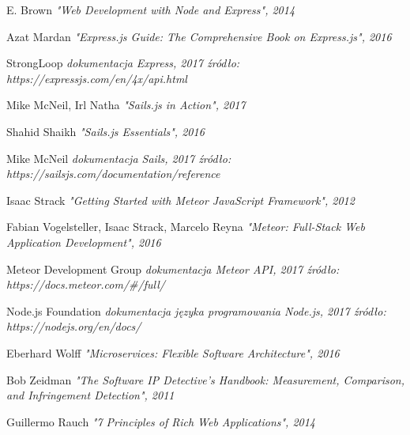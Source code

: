 \documentclass[12pt]{report}
\begin{document}

\begin{thebibliography}{99}
    E. Brown \newline
    \textit{"Web Development with Node and Express", 2014}

    Azat Mardan \newline
    \textit{"Express.js Guide: The Comprehensive Book on Express.js", 2016}

    StrongLoop \newline
    \textit{dokumentacja Express, 2017 \newline źródło: https://expressjs.com/en/4x/api.html}

    Mike McNeil, Irl Natha \newline
    \textit{"Sails.js in Action", 2017}

    Shahid Shaikh \newline
    \textit{"Sails.js Essentials", 2016}

    Mike McNeil \newline
    \textit{dokumentacja Sails, 2017 \newline źródło: https://sailsjs.com/documentation/reference}

    Isaac Strack \newline
    \textit{"Getting Started with Meteor JavaScript Framework", 2012}

    Fabian Vogelsteller, Isaac Strack, Marcelo Reyna \newline
    \textit{"Meteor: Full-Stack Web Application Development", 2016}

    Meteor Development Group \newline
    \textit{dokumentacja Meteor API, 2017 \newline źródło: https://docs.meteor.com/\#/full/}

    Node.js Foundation \newline
    \textit{dokumentacja języka programowania Node.js, 2017 \newline źródło: https://nodejs.org/en/docs/}

    Eberhard Wolff \newline
    \textit{"Microservices: Flexible Software Architecture", 2016}

    Bob Zeidman \newline
    \textit{"The Software IP Detective's Handbook: Measurement, Comparison, and Infringement Detection", 2011}
    
    Guillermo Rauch \newline
    \textit{"7 Principles of Rich Web Applications", 2014}

\end{thebibliography}


\listoffigures
\end{document}
